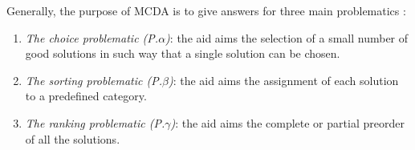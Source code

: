 Generally, the purpose of MCDA is to give answers for three main problematics \cite{EhrgottFigueiraGreco2005}:
\begin{enumerate}
\item \textit{The choice problematic (P.$\alpha$)}: the aid aims the selection of a small number of good solutions in such way that a single solution can be chosen.
\item \textit{The sorting problematic (P.$\beta$)}: the aid aims the assignment of each solution to a predefined category.
\item \textit{The ranking problematic (P.$\gamma$)}: the aid aims the complete or partial preorder of all the solutions.
\end{enumerate}
